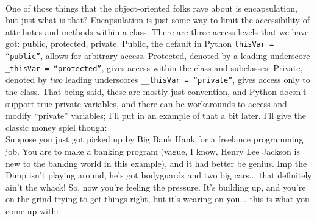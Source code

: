 \documentclass[12pt]{article}
\begin{document}
\\

One of those things that the object-oriented folks rave about is encapsulation, but just what is that? Encapsulation is just some way to limit the accessibility of attributes and methods within a class. There are three access levels that we have got: public, protected, private. Public, the default in Python \texttt{thisVar = ``public''}, allows for arbitrary access. Protected, denoted by a leading underscore \texttt{\_thisVar = ``protected''}, gives access within the class and subclasses. Private, denoted by \textit{two} leading underscores \texttt{\_\_thisVar = ``private''}, gives access only to the class. That being said, these are mostly just convention, and Python doesn't support true private variables, and there can be workarounds to access and modify ``private'' variables; I'll put in an example of that a bit later. I'll give the classic money spiel though:\\
Suppose you just got picked up by Big Bank Hank for a freelance programming job. You are to make a banking program (vague, I know, Henry Lee Jackson is new to the banking world in this example), and it had better be genius. Imp the Dimp isn't playing around, he's got bodyguards and two big cars... that definitely ain't the whack! So, now you're feeling the pressure. It's building up, and you're on the grind trying to get things right, but it's wearing on you... this is what you come up with:\\
\end{document}
